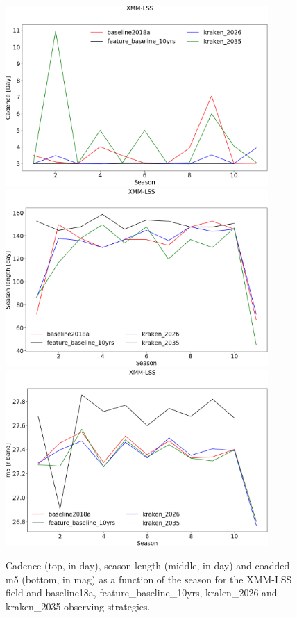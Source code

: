 

\begin{figure}[htbp]
\begin{center}
  \includegraphics[width=10cm]{Figures/XMM-LSS_cadence.png}
  \includegraphics[width=10cm]{Figures/XMM-LSS_season_length.png}
  \includegraphics[width=10cm]{Figures/XMM-LSS_m5.png}
 \caption{Cadence (top, in day), season length (middle, in day) and coadded m5 (bottom, in mag) as a function of the season for the XMM-LSS field and baseline18a, feature\_baseline\_10yrs, kralen\_2026 and kraken\_2035 observing strategies.}\label{fig:xmm-lss_cad}
\end{center}
\end{figure}

